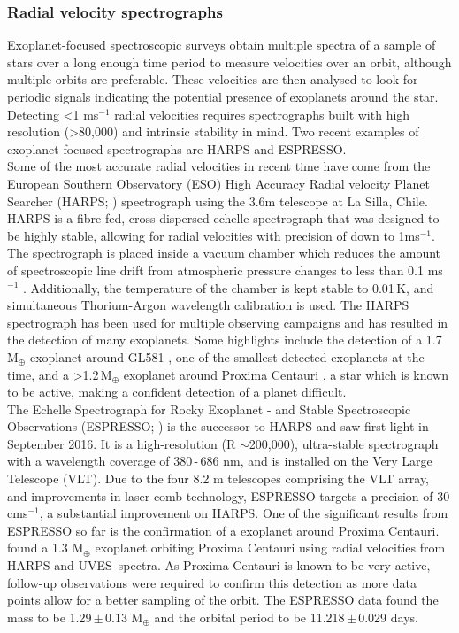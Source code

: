 \subsubsection{Radial velocity spectrographs}
\label{secSpecSurveys}
Exoplanet-focused spectroscopic surveys obtain multiple spectra of a sample of stars over a long enough time period to measure velocities over an orbit, although multiple orbits are preferable. These velocities are then analysed to look for periodic signals indicating the potential presence of exoplanets around the star. Detecting \textless1 ms$^{-1}$ radial velocities requires spectrographs built with high resolution (\textgreater 80,000) and intrinsic stability in mind. Two recent examples of exoplanet-focused spectrographs are HARPS and ESPRESSO.\\

Some of the most accurate radial velocities in recent time have come from the European Southern Observatory (ESO) High Accuracy Radial velocity Planet Searcher (HARPS; \citealt{2003Mayor}) spectrograph using the 3.6m telescope at La Silla, Chile. HARPS is a fibre-fed, cross-dispersed echelle spectrograph that was designed to be highly stable, allowing for radial velocities with precision of down to 1ms$^{-1}$. The spectrograph is placed inside a vacuum chamber which reduces the amount of spectroscopic line drift from atmospheric pressure changes to less than 0.1 ms$^{-1}$ \citep{2004Rupprecht}. Additionally, the temperature of the chamber is kept stable to 0.01\,K, and simultaneous Thorium-Argon wavelength calibration is used. The HARPS spectrograph has been used for multiple observing campaigns and has resulted in the detection of many exoplanets. Some highlights include the detection of a 1.7\,M$_\oplus$ exoplanet around GL581 \citep{2009Mayor}, one of the smallest detected exoplanets at the time, and a \textgreater1.2\,M$_\oplus$ exoplanet around Proxima Centauri \citep{2016AngladaEscude}, a star which is known to be active, making a confident detection of a planet difficult.\\

The Echelle Spectrograph for Rocky Exoplanet - and Stable Spectroscopic Observations (ESPRESSO; \citealt{2013Pepe}) is the successor to HARPS and saw first light in September 2016. It is a high-resolution (R $\sim$200,000), ultra-stable spectrograph with a wavelength coverage of 380\,-\,686 nm, and is installed on the Very Large Telescope (VLT). Due to the four 8.2 m telescopes comprising the VLT array, and improvements in laser-comb technology, ESPRESSO targets a precision of 30 cms$^{-1}$, a substantial improvement on HARPS. One of the significant results from ESPRESSO so far is the confirmation of a exoplanet around Proxima Centauri. \citet{2016AngladaEscude} found a 1.3 M$_\oplus$ exoplanet orbiting Proxima Centauri using radial velocities from HARPS and UVES\,\citep{2000Dekker} spectra. As Proxima Centauri is known to be very active, follow-up observations were required to confirm this detection as more data points allow for a better sampling of the orbit. The ESPRESSO data found the mass to be 1.29\,$\pm$\,0.13 M$_\oplus$ and the orbital period to be 11.218\,$\pm$\,0.029 days.

